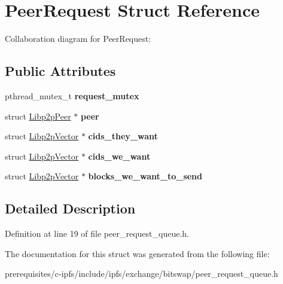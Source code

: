 \hypertarget{struct_peer_request}{}\section{Peer\+Request Struct Reference}
\label{struct_peer_request}


Collaboration diagram for Peer\+Request\+:
\subsection*{Public Attributes}
\begin{DoxyCompactItemize}
\item 
\mbox{\label{struct_peer_request_a3ab3d3ca09120f9a3028de0905f66f4c}} 
pthread\+\_\+mutex\+\_\+t {\bfseries request\+\_\+mutex}
\item 
\mbox{\label{struct_peer_request_a29396a7910a5e87bca1d5ca8a2d3ab22}} 
struct \mbox{\hyperlink{struct_libp2p_peer}{Libp2p\+Peer}} $\ast$ {\bfseries peer}
\item 
\mbox{\label{struct_peer_request_a7330ab193429d65fadf556c3c25e7e07}} 
struct \mbox{\hyperlink{struct_libp2p_vector}{Libp2p\+Vector}} $\ast$ {\bfseries cids\+\_\+they\+\_\+want}
\item 
\mbox{\label{struct_peer_request_a95448a5dfe21874268262136e82dca65}} 
struct \mbox{\hyperlink{struct_libp2p_vector}{Libp2p\+Vector}} $\ast$ {\bfseries cids\+\_\+we\+\_\+want}
\item 
\mbox{\label{struct_peer_request_aa28dc15aa549156b2c327f770217431b}} 
struct \mbox{\hyperlink{struct_libp2p_vector}{Libp2p\+Vector}} $\ast$ {\bfseries blocks\+\_\+we\+\_\+want\+\_\+to\+\_\+send}
\end{DoxyCompactItemize}


\subsection{Detailed Description}


Definition at line 19 of file peer\+\_\+request\+\_\+queue.\+h.



The documentation for this struct was generated from the following file\+:\begin{DoxyCompactItemize}
\item 
prerequisites/c-\/ipfs/include/ipfs/exchange/bitswap/peer\+\_\+request\+\_\+queue.\+h\end{DoxyCompactItemize}
